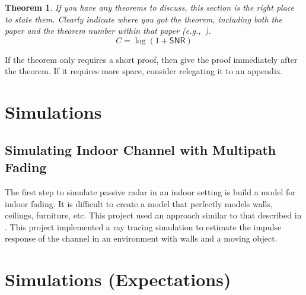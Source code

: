 \documentclass[article,11pt,onecolumn,final]{IEEEtran}
\newtheorem{theorem}{Theorem}
\begin{document}
\begin{theorem}
If you have any theorems to discuss, this section is the right place to state them. Clearly indicate where you got the theorem, including both the paper and the theorem number within that paper (e.g.,~\cite[Theorem 2]{Shannon1948}).
\begin{equation}
C = \log(1 + \mathsf{SNR}) \label{e:capacity}
\end{equation}
\end{theorem}
\begin{IEEEproof}
If the theorem only requires a short proof, then give the proof immediately after the theorem. If it requires more space, consider relegating it to an appendix. 
\end{IEEEproof}

\section{Simulations}
\subsection{Simulating Indoor Channel with Multipath Fading}
The first step to simulate passive radar in an indoor setting is build a model for indoor fading. It is difficult to create a model that perfectly models walls, ceilings, furniture, etc. This project used an approach similar to that described in \cite{Holt}. This project implemented a ray tracing simulation to estimate the impulse response of the channel in an environment with walls and a moving object. 

\section{Simulations (Expectations)} 
\end{document}
